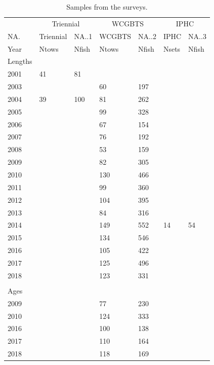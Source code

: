 \documentclass[12pt,]{article}
\begin{document}
\begin{table}[ht]
\centering
\caption{Samples from the surveys.} 
\label{tab:Survey_Samples}
\begin{tabular}{lllllll}
  \hline
   \multicolumn{1}{c}{} & \multicolumn{2}{c}{Triennial} & \multicolumn{2}{c}{WCGBTS} & \multicolumn{2}{c}{IPHC} \\  \cmidrule(lr){2-3} \cmidrule(lr){4-5} \cmidrule(lr){6-7}
  NA. & Triennial & NA..1 & WCGBTS & NA..2 & IPHC & NA..3 \\ 
  \hline
Year & Ntows & Nfish & Ntows & Nfish & Nsets & Nfish \\ 
  Lengths &  &  &  &  &  &  \\ 
  2001 & 41 & 81 &  &  &  &  \\ 
  2003 &  &  & 60 & 197 &  &  \\ 
  2004 & 39 & 100 & 81 & 262 &  &  \\ 
  2005 &  &  & 99 & 328 &  &  \\ 
  2006 &  &  & 67 & 154 &  &  \\ 
  2007 &  &  & 76 & 192 &  &  \\ 
  2008 &  &  & 53 & 159 &  &  \\ 
  2009 &  &  & 82 & 305 &  &  \\ 
  2010 &  &  & 130 & 466 &  &  \\ 
  2011 &  &  & 99 & 360 &  &  \\ 
  2012 &  &  & 104 & 395 &  &  \\ 
  2013 &  &  & 84 & 316 &  &  \\ 
  2014 &  &  & 149 & 552 & 14 & 54 \\ 
  2015 &  &  & 134 & 546 &  &  \\ 
  2016 &  &  & 105 & 422 &  &  \\ 
  2017 &  &  & 125 & 496 &  &  \\ 
  2018 &  &  & 123 & 331 &  &  \\ 
   &  &  &  &  &  &  \\ 
  Ages &  &  &  &  &  &  \\ 
  2009 &  &  & 77 & 230 &  &  \\ 
  2010 &  &  & 124 & 333 &  &  \\ 
  2016 &  &  & 100 & 138 &  &  \\ 
  2017 &  &  & 110 & 164 &  &  \\ 
  2018 &  &  & 118 & 169 &  &  \\ 
   \hline
  \end{tabular}
\end{table}
\end{document}
